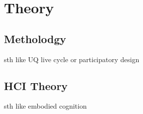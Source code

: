 \chapter{Theory}
\section{Metholodgy}
sth like UQ live cycle or participatory design
\section{HCI Theory}
sth like embodied cognition
